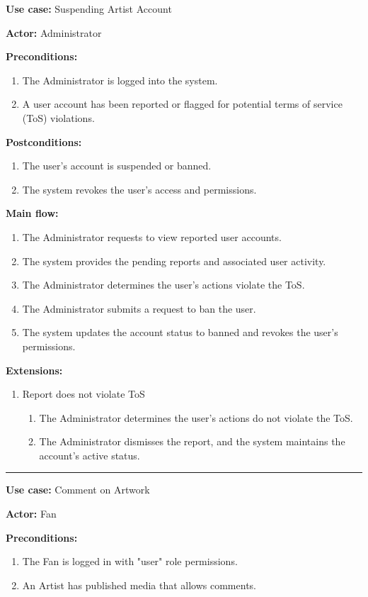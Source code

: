\documentclass{article}
\begin{document}
{\bfseries Use case:} Suspending Artist Account

{\bfseries Actor:} Administrator

{\bfseries Preconditions:}
\begin{enumerate}
	\item The Administrator is logged into the system.
	\item A user account has been reported or flagged for potential terms of service (ToS) violations.
\end{enumerate}

{\bfseries Postconditions:}
\begin{enumerate}
	\item The user's account is suspended or banned.
	\item The system revokes the user's access and permissions.
\end{enumerate}

{\bfseries Main flow:}
\begin{enumerate}
	\item The Administrator requests to view reported user accounts.
	\item The system provides the pending reports and associated user activity.
	\item The Administrator determines the user's actions violate the ToS.
	\item The Administrator submits a request to ban the user.
	\item The system updates the account status to banned and revokes the user's permissions.
\end{enumerate}

{\bfseries Extensions:}
\begin{enumerate}
	\item [3a.] Report does not violate ToS
	\begin{enumerate}
		\item [3a1.] The Administrator determines the user's actions do not violate the ToS.
		\item [3a2.] The Administrator dismisses the report, and the system maintains the account's active status.
	\end{enumerate}
\end{enumerate}


\hrule
\bigskip

{\bfseries Use case:} Comment on Artwork

{\bfseries Actor:} Fan

{\bfseries Preconditions:}
\begin{enumerate}
	\item The Fan is logged in with "user" role permissions.
	\item An Artist has published media that allows comments.
\end{enumerate}
\end{document}

